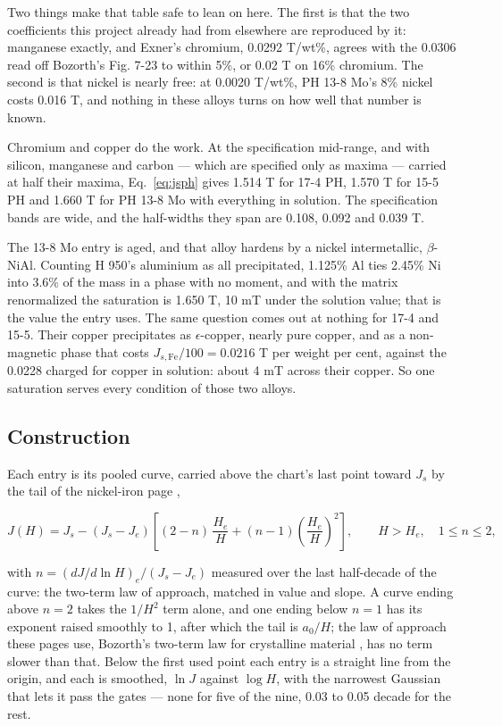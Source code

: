 \documentclass[
  11pt,
]{article}
\newcounter{none} %
\begin{document}
Two things make that table safe to lean on here. The first is that the two coefficients this project already had from elsewhere are reproduced by it: manganese exactly, and Exner's chromium, 0.0292 T/wt\%, agrees with the 0.0306 read off Bozorth's Fig. 7-23 to within 5\%, or 0.02 T on 16\% chromium. The second is that nickel is nearly free: at 0.0020 T/wt\%, PH 13-8 Mo's 8\% nickel costs 0.016 T, and nothing in these alloys turns on how well that number is known.

Chromium and copper do the work. At the specification mid-range, and with silicon, manganese and carbon --- which are specified only as maxima --- carried at half their maxima, Eq.~\eqref{eq:jsph} gives 1.514 T for 17-4 PH, 1.570 T for 15-5 PH and 1.660 T for PH 13-8 Mo with everything in solution. The specification bands are wide, and the half-widths they span are 0.108, 0.092 and 0.039 T.

The 13-8 Mo entry is aged, and that alloy hardens by a nickel intermetallic, \(\beta\)-NiAl. Counting H 950's aluminium as all precipitated, 1.125\% Al ties 2.45\% Ni into 3.6\% of the mass in a phase with no moment, and with the matrix renormalized the saturation is 1.650 T, 10 mT under the solution value; that is the value the entry uses. The same question comes out at nothing for 17-4 and 15-5. Their copper precipitates as \(\epsilon\)-copper, nearly pure copper, and as a non-magnetic phase that costs \(J_{s,\mathrm{Fe}}/100 = 0.0216\) T per weight per cent, against the 0.0228 charged for copper in solution: about 4 mT across their copper. So one saturation serves every condition of those two alloys.

\subsection{Construction}\label{ph-construction}

Each entry is its pooled curve, carried above the chart's last point toward \(J_s\) by the tail of the nickel-iron page \cite{meeker-nife},

\begin{equation}\label{eq:tail}
J(H) = J_s - (J_s - J_e)\left[(2-n)\,\frac{H_e}{H} + (n-1)\left(\frac{H_e}{H}\right)^{2}\right], \qquad H > H_e,\quad 1 \le n \le 2,
\end{equation}

with \(n = (dJ/d\ln H)_e/(J_s - J_e)\) measured over the last half-decade of the curve: the two-term law of approach, matched in value and slope. A curve ending above \(n = 2\) takes the \(1/H^{2}\) term alone, and one ending below \(n = 1\) has its exponent raised smoothly to 1, after which the tail is \(a_0/H\); the law of approach these pages use, Bozorth's two-term law for crystalline material \cite{bozorth1951}, has no term slower than that. Below the first used point each entry is a straight line from the origin, and each is smoothed, \(\ln J\) against \(\log H\), with the narrowest Gaussian that lets it pass the gates --- none for five of the nine, 0.03 to 0.05 decade for the rest.
\end{document}
